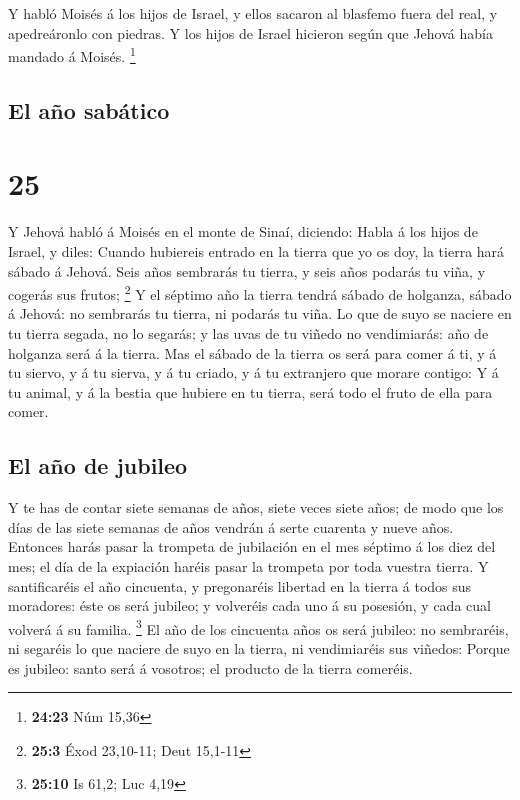  Y habló Moisés á los hijos de Israel, y ellos sacaron al
blasfemo fuera del real, y apedreáronlo con piedras. Y los hijos de
Israel hicieron según que Jehová había mandado á Moisés. \footnote{\textbf{24:23}
  Núm 15,36}

\hypertarget{el-auxf1o-sabuxe1tico}{%
\subsection{El año sabático}\label{el-auxf1o-sabuxe1tico}}

\hypertarget{section-24}{%
\section{25}\label{section-24}}

 Y Jehová habló á Moisés en el monte de Sinaí, diciendo:
 Habla á los hijos de Israel, y diles: Cuando hubiereis
entrado en la tierra que yo os doy, la tierra hará sábado á Jehová.
 Seis años sembrarás tu tierra, y seis años podarás tu
viña, y cogerás sus frutos; \footnote{\textbf{25:3} Éxod 23,10-11; Deut
  15,1-11}  Y el séptimo año la tierra tendrá sábado de
holganza, sábado á Jehová: no sembrarás tu tierra, ni podarás tu viña.
 Lo que de suyo se naciere en tu tierra segada, no lo
segarás; y las uvas de tu viñedo no vendimiarás: año de holganza será á
la tierra.  Mas el sábado de la tierra os será para comer
á ti, y á tu siervo, y á tu sierva, y á tu criado, y á tu extranjero que
morare contigo:  Y á tu animal, y á la bestia que hubiere
en tu tierra, será todo el fruto de ella para comer.

\hypertarget{el-auxf1o-de-jubileo}{%
\subsection{El año de jubileo}\label{el-auxf1o-de-jubileo}}

 Y te has de contar siete semanas de años, siete veces
siete años; de modo que los días de las siete semanas de años vendrán á
serte cuarenta y nueve años.  Entonces harás pasar la
trompeta de jubilación en el mes séptimo á los diez del mes; el día de
la expiación haréis pasar la trompeta por toda vuestra tierra.
 Y santificaréis el año cincuenta, y pregonaréis libertad
en la tierra á todos sus moradores: éste os será jubileo; y volveréis
cada uno á su posesión, y cada cual volverá á su familia. \footnote{\textbf{25:10}
  Is 61,2; Luc 4,19}  El año de los cincuenta años os
será jubileo: no sembraréis, ni segaréis lo que naciere de suyo en la
tierra, ni vendimiaréis sus viñedos:  Porque es jubileo:
santo será á vosotros; el producto de la tierra comeréis.

